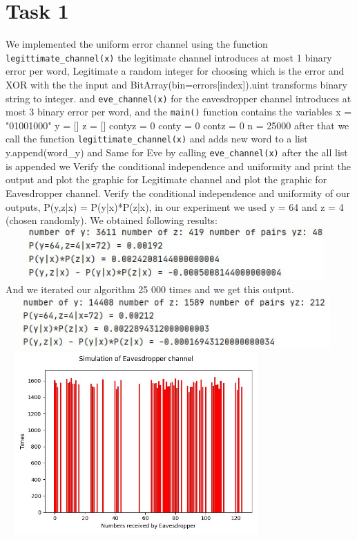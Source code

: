 \documentclass{report}
\begin{document}
 \section*{Task 1}
\par We implemented the uniform error channel using the function {\tt legittimate\_channel(x)} the legitimate channel introduces at most 1 binary error per word,
 Legitimate a random integer for choosing which is the error and XOR with the the input and {BitArray(bin=errors[index]).uint} transforms binary string to integer. and {\tt eve\_channel(x)} for the eavesdropper channel introduces at most 3 binary error per word, and the {\tt main()} function contains the variables  x = "01001000"
  y = []
  z = []
  contyz = 0
  conty = 0
  contz = 0
  n = 25000 after that we call the function  {\tt legittimate\_channel(x)} and adds new word to a list y.append(word\_y) and Same for Eve by  calling {\tt eve\_channel(x)} after the all list is appended we Verify the conditional independence and uniformity and print the output and plot the graphic for Legitimate channel and plot the graphic for Eavesdropper channel. \hfill \break \linebreak  Verify the conditional independence and uniformity of our outputs, P(y,z|x) = P(y|x)*P(z|x), in our experiment we used y = 64 and z = 4 (chosen randomly). We obtained following results:  \hfill \break
    \linebreak
  \includegraphics[width=13cm,height=2cm]{output1}
  \linebreak And we iterated our algorithm 25 000 times and we get this output.\hfill \break
   \includegraphics[width=13cm,height=2cm]{output2} \hfill \break
  \includegraphics[width=10cm,height=7cm]{1} \linebreak
\end{document}
